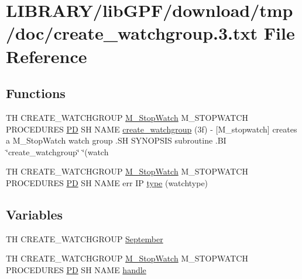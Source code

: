 \hypertarget{create__watchgroup_83_8txt}{}\section{L\+I\+B\+R\+A\+R\+Y/lib\+G\+P\+F/download/tmp/doc/create\+\_\+watchgroup.3.txt File Reference}
\label{create__watchgroup_83_8txt}
\subsection*{Functions}
\begin{DoxyCompactItemize}
\item 
TH C\+R\+E\+A\+T\+E\+\_\+\+W\+A\+T\+C\+H\+G\+R\+O\+UP \hyperlink{option__stopwatch_83_8txt_aa2011fc45a5e502e87ee50996a8a9305}{M\+\_\+\+Stop\+Watch} M\+\_\+\+S\+T\+O\+P\+W\+A\+T\+CH P\+R\+O\+C\+E\+D\+U\+R\+ES \hyperlink{what__overview_81_8txt_a85f26da5a4481fbdb0d9c79f2b94de3e}{PD} SH N\+A\+ME \hyperlink{create__watchgroup_83_8txt_a7e1fab3a0b16096cc31b6750b1a1fa6f}{create\+\_\+watchgroup} (3f) -\/ \mbox{[}\+M\+\_\+stopwatch\mbox{]} creates a M\+\_\+\+Stop\+Watch watch group .\+S\+H S\+Y\+N\+O\+P\+S\+I\+S subroutine .\+B\+I \char`\"{}create\+\_\+watchgroup\char`\"{} \char`\"{}(watch
\item 
TH C\+R\+E\+A\+T\+E\+\_\+\+W\+A\+T\+C\+H\+G\+R\+O\+UP \hyperlink{option__stopwatch_83_8txt_aa2011fc45a5e502e87ee50996a8a9305}{M\+\_\+\+Stop\+Watch} M\+\_\+\+S\+T\+O\+P\+W\+A\+T\+CH P\+R\+O\+C\+E\+D\+U\+R\+ES \hyperlink{what__overview_81_8txt_a85f26da5a4481fbdb0d9c79f2b94de3e}{PD} SH N\+A\+ME err IP \hyperlink{create__watchgroup_83_8txt_adc4024c3b4c8e8b4c2f17a2937352e5d}{type} (watchtype)
\end{DoxyCompactItemize}
\subsection*{Variables}
\begin{DoxyCompactItemize}
\item 
TH C\+R\+E\+A\+T\+E\+\_\+\+W\+A\+T\+C\+H\+G\+R\+O\+UP \hyperlink{create__watchgroup_83_8txt_a2fe56ee2e395403bb06376136f40e45c}{September}
\item 
TH C\+R\+E\+A\+T\+E\+\_\+\+W\+A\+T\+C\+H\+G\+R\+O\+UP \hyperlink{option__stopwatch_83_8txt_aa2011fc45a5e502e87ee50996a8a9305}{M\+\_\+\+Stop\+Watch} M\+\_\+\+S\+T\+O\+P\+W\+A\+T\+CH P\+R\+O\+C\+E\+D\+U\+R\+ES \hyperlink{what__overview_81_8txt_a85f26da5a4481fbdb0d9c79f2b94de3e}{PD} SH N\+A\+ME \hyperlink{create__watchgroup_83_8txt_a5f82c33d958a5267f1648fdea2152853}{handle}
\end{DoxyCompactItemize}



